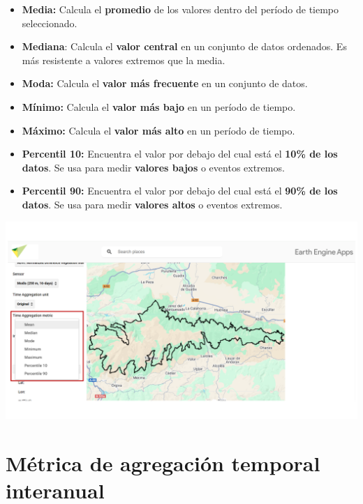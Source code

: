 \documentclass[
]{book}
\providecommand{\tightlist}{%
  \setlength{\itemsep}{0pt}\setlength{\parskip}{0pt}}
\begin{document}
\begin{itemize}
\tightlist
\item
  \textbf{Media:} Calcula el \textbf{promedio} de los valores dentro del período de tiempo seleccionado.\\
\item
  \textbf{Mediana}: Calcula el \textbf{valor central} en un conjunto de datos ordenados. Es más resistente a valores extremos que la media.\\
\item
  \textbf{Moda:} Calcula el \textbf{valor más frecuente} en un conjunto de datos.\\
\item
  \textbf{Mínimo:} Calcula el \textbf{valor más bajo} en un período de tiempo.\\
\item
  \textbf{Máximo:} Calcula el \textbf{valor más alto} en un período de tiempo.\\
\item
  \textbf{Percentil 10:} Encuentra el valor por debajo del cual está el \textbf{10\% de los datos}. Se usa para medir \textbf{valores bajos} o eventos extremos.\\
\item
  \textbf{Percentil 90:} Encuentra el valor por debajo del cual está el \textbf{90\% de los datos}. Se usa para medir \textbf{valores altos} o eventos extremos.
\end{itemize}

\includegraphics{assets/aggregationTime.png}

\chapter{Métrica de agregación temporal interanual}\label{agregacion-temporal-interanual}
\end{document}
